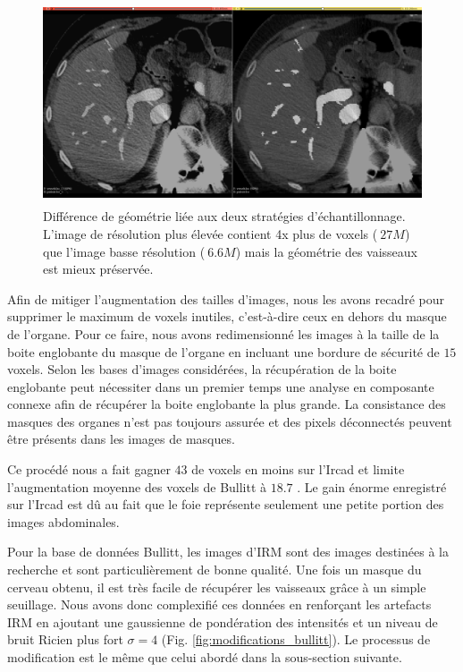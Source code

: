 \begin{figure}[h]
  \centering
  \includegraphics[height=6cm]{Images/resolution_comparison.png}
  \caption{Différence de géométrie liée aux deux stratégies d'échantillonnage. L'image de résolution plus élevée contient 4x plus de voxels ($~27M$) que l'image basse résolution ($~6.6M$) mais la géométrie des vaisseaux est mieux préservée.}
  \label{fig:resolution_comparison}
\end{figure}

Afin de mitiger l'augmentation des tailles d'images, nous les avons recadré pour supprimer le maximum de voxels inutiles, c'est-à-dire ceux en dehors du masque de l'organe. Pour ce faire, nous avons redimensionné les images à la taille de la boite englobante du masque de l'organe en incluant une bordure de sécurité de $15$ voxels. Selon les bases d'images considérées, la récupération de la boite englobante peut nécessiter dans un premier temps une analyse en composante connexe afin de récupérer la boite englobante la plus grande. La consistance des masques des organes n'est pas toujours assurée et des pixels déconnectés peuvent être présents dans les images de masques.

Ce procédé nous a fait gagner $43$ \percent de voxels en moins sur l'Ircad et limite l'augmentation moyenne des voxels de Bullitt à $18.7$ \percent. Le gain énorme enregistré sur l'Ircad est dû au fait que le foie représente seulement une petite portion des images abdominales.

Pour la base de données Bullitt, les images d'IRM sont des images destinées à la recherche et sont particulièrement de bonne qualité. Une fois un masque du cerveau obtenu, il est très facile de récupérer les vaisseaux grâce à un simple seuillage. Nous avons donc complexifié ces données en renforçant les artefacts IRM en ajoutant une gaussienne de pondération des intensités et un niveau de bruit Ricien plus fort $\sigma=4$ (Fig. \ref{fig:modifications_bullitt}). Le processus de modification est le même que celui abordé dans la sous-section suivante.

